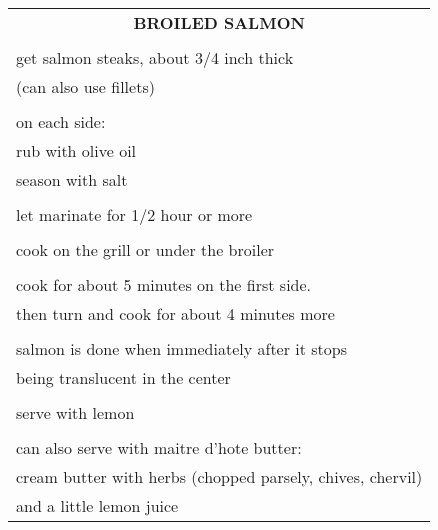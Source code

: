 \documentclass[8pt]{report}
\begin{document}
\newpage

\centering

\begin{tabular}{|l|} \hline	%
 
\multicolumn{1}{|c|}{\textbf{BROILED SALMON}}
\\
\\

\index{fish/meat!broiled salmon} \index{broiled salmon}
\index{salmon!broiled}

get salmon steaks, about 3/4 inch thick\\
(can also use fillets)\\
\\
on each side:\\
\hspace{0.5 in}	rub with olive oil\\
\hspace{0.5 in}	season with salt\\
\\
let marinate for 1/2 hour or more\\
\\
cook on the grill or under the broiler\\
\\
cook for about 5 minutes on the first side.\\
then turn and cook for about 4 minutes more\\
\\
salmon is done when immediately after it stops\\
being translucent in the center\\
\\
serve with lemon\\
\\
can also serve with maitre d'hote butter:\\
\hspace{0.5 in}	cream butter with herbs (chopped parsely, chives,
chervil)\\
\hspace{0.5 in}	and a little lemon juice\\


\hline

\end{tabular}

\newpage
\centering
\end{document}
